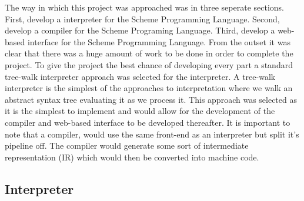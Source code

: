 \documentclass[final]{cmpreport_02}
\begin{document}
The way in which this project was approached was in three seperate sections. First, develop a interpreter for the Scheme Programming Language. Second, develop a compiler for the Scheme Programing Language. Third, develop a web-based interface for the Scheme Programming Language.
From the outset it was clear that there was a huge amount of work to be done in order to complete the project. To give the project the best chance of developing every part a standard tree-walk interpreter approach was selected for the interpreter.
A tree-walk interpreter is the simplest of the approaches to interpretation where we walk an abstract syntax tree evaluating it as we process it. This approach was selected as it is the simplest to implement and would allow for the development of the compiler and web-based interface to be developed thereafter.
It is important to note that a compiler, would use the same front-end as an interpreter but split it's pipeline off. The compiler would generate some sort of intermediate representation (IR) which would then be converted into machine code.

\subsection{Interpreter}
\end{document}
